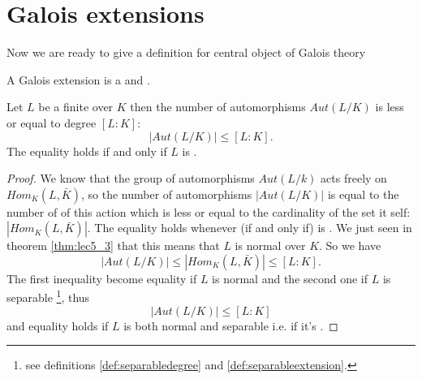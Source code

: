 \section{Galois extensions}

Now we are ready to give a definition for central object of Galois
theory

\begin{definition}
  A Galois extension is a  and
  .
  \label{def:galoisextension}
\end{definition}

\begin{theorem}
  Let $L$ be a finite over $K$ then the number of automorphisms
  $Aut\left(L/K\right)$ is less or equal to degree
  $\left[L:K\right]$:
  \[
  \left|Aut\left(L/K\right)\right| \le \left[L:K\right].
  \]
  The equality holds if and only if $L$ is
  .
  \begin{proof}
    We know that the group of automorphisms $Aut\left(L/k\right)$ acts
    freely on $Hom_K\left(L, \bar{K}\right)$, so the number of
    automorphisms $\left|Aut\left(L/K\right)\right|$ is equal to the
    number of  of this action which is less or
    equal to the cardinality of the set it self:
    $\left|Hom_K\left(L, \bar{K}\right)\right|$. The equality holds
    whenever (if and only if)  is . We
    just seen in 
    theorem \ref{thm:lec5_3} that this means that $L$ is normal over
    $K$. So we have
    \[
    \left|Aut\left(L/K\right)\right| \le
    \left|Hom_K\left(L, \bar{K}\right)\right| \le
    \left[L:K\right].
    \]
    The first inequality become equality if $L$ is normal and the
    second one if $L$ is separable
    \footnote{
      see definitions \ref{def:separabledegree} and \ref{def:separableextension}.
    }, thus
    \[
    \left|Aut\left(L/K\right)\right| \le \left[L:K\right]
    \]
    and equality holds if $L$ is both normal and separable i.e. if
    it's .
  \end{proof}
  \label{thm:lec5_4}
\end{theorem}

